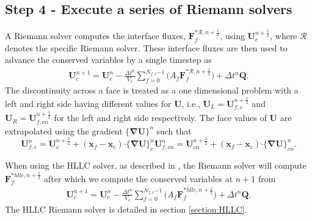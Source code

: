 \documentclass[10pt,letterpaper,notitlepage]{article}
\numberwithin{equation}{section}
\newcommand{\bnabla}{\boldsymbol{\nabla}}
\newcommand{\position}{\mathbf{x}}
\newcommand{\dotp}{\boldsymbol{\cdot}}
\newcommand{\beqn}{\begin{equation}\begin{aligned}}
\newcommand{\eeqn}{\end{aligned}\end{equation}}
\begin{document}
\subsection{Step 4 - Execute a series of Riemann solvers}
A Riemann solver computes the interface fluxes, $\mathbf{F}_f^{*\mathcal{R},n{+}\frac{1}{2}}$, using $\mathbf{U}_c^{n{+}\frac{1}{2}}$, where $\mathcal{R}$ denotes the specific Riemann solver. These interface fluxes are then used to advance the conserved variables by a single timestep as
\beqn 
\mathbf{U}_c^{n+1} = \mathbf{U}_c^n - \frac{\Delta t^n}{V_c} \sum_{f=0}^{N_{f,c}{-1}} 
\biggr(
A_f
\mathbf{F}_f^{*\mathcal{R},n{+}\frac{1}{2}}
\biggr)
+ \Delta t^n \mathbf{Q}.
\eeqn 
The discontinuity across a face is treated as a one dimensional problem with a left and right side having different values for $\mathbf{U}$, i.e., $\mathbf{U}_L = \mathbf{U}_{f,c}^{n{+}\frac{1}{2}}$ and $\mathbf{U}_R = \mathbf{U}_{f,cn}^{n{+}\frac{1}{2}}$ for the left and right side respectively. The face values of $\mathbf{U}$ are extrapolated using the gradient $\{\bnabla\mathbf{U}\}^n$ such that
\begin{subequations}
\begin{equation}
\mathbf{U}_{f,c}^{n} = \mathbf{U}_c^{n+\frac{1}{2}}  + (\position_{f} - \position_c) \dotp \big\{ \bnabla \mathbf{U} \big\}_c^n
\end{equation}
\begin{equation}
\mathbf{U}_{f,cn}^{n} = \mathbf{U}_{cn}^{n+\frac{1}{2}}  + (\position_{f} - \position_c) \dotp \big\{ \bnabla \mathbf{U} \big\}_{cn}^n.
\end{equation}
\end{subequations}




When using the HLLC solver, as described in \cite{Toro}, the Riemann solver will compute $\mathbf{F}_f^{*hllc,n{+}\frac{1}{2}}$ after which we compute the conserved variables at $n+1$ from
\beqn 
\mathbf{U}_c^{n+1} = \mathbf{U}_c^n - \frac{\Delta t^n}{V_c} \sum_{f=0}^{N_{f,c}{-1}} 
\biggr(
A_f
\mathbf{F}_f^{*hllc,n{+}\frac{1}{2}}
\biggr)
+ \Delta t^n \mathbf{Q}.
\eeqn 
The HLLC Riemann solver is detailed in section \ref{section:HLLC}.

\newpage 
\end{document}
